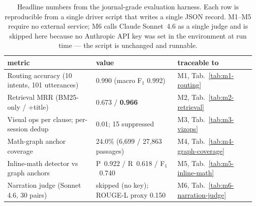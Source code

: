 \begin{table}[!htbp]
\centering
\caption{Headline numbers from the journal-grade evaluation harness.  Each row is reproducible from a single driver script that writes a single JSON record.  M1--M5 require no external service; M6 calls Claude Sonnet~4.6 as a single judge and is skipped here because no Anthropic API key was set in the environment at run time --- the script is unchanged and runnable.}
\label{tab:eval-summary}
\small
\begin{tabularx}{\linewidth}{X l l}
\toprule
metric & value & traceable to \\
\midrule
Routing accuracy (10 intents, 101 utterances) & 0.990 (macro F$_1$ 0.992) & M1, Tab.~\ref{tab:m1-routing} \\
Retrieval MRR (BM25-only / +title) & 0.673 / \textbf{0.966} & M2, Tab.~\ref{tab:m2-retrieval} \\
Visual ops per clause; per-session dedup & 0.01; 15 suppressed & M3, Tab.~\ref{tab:m3-vizops} \\
Math-graph anchor coverage & 24.0\% (6,699 / 27,863 passages) & M4, Tab.~\ref{tab:m4-graph-coverage} \\
Inline-math detector vs graph anchors & P~0.922 / R~0.618 / F$_1$~0.740 & M5, Tab.~\ref{tab:m5-inline-math} \\
Narration judge (Sonnet 4.6, 30 pairs) & skipped (no key); ROUGE-L proxy 0.150 & M6, Tab.~\ref{tab:m6-narration-judge} \\
\bottomrule
\end{tabularx}
\end{table}
